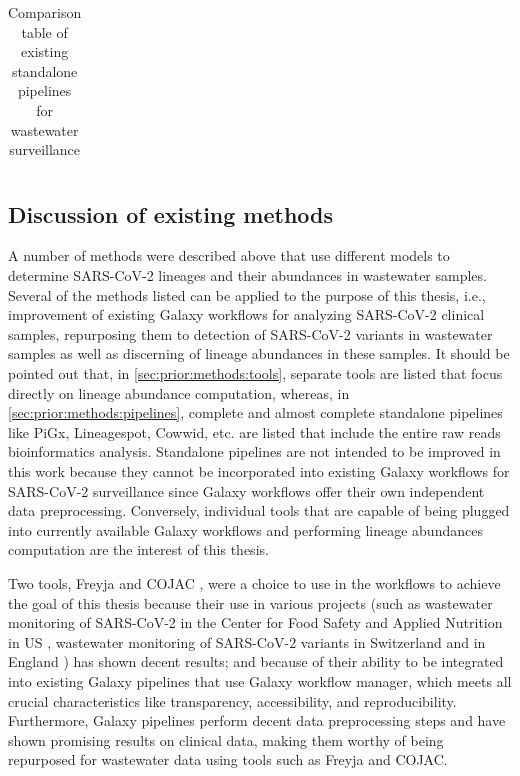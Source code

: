 \begin{landscape}
\begin{table}[ht!]
\begin{tabular}{l|l|l|l|l|l|l|l|l|l|l}
                \end{tabular}
                \caption{Comparison table of existing standalone pipelines for wastewater surveillance} \label{tab:prior:methods-pipelines}
                \end{table}
                \vfill
            \end{landscape}
        

    \subsection{Discussion of existing methods} \label{sec:prior:discussion}
    A number of methods were described above that use different models to determine SARS-CoV-2 lineages and their abundances in wastewater samples. Several of the methods listed can be applied to the purpose of this thesis, i.e., improvement of existing Galaxy workflows for analyzing SARS-CoV-2 clinical samples, repurposing them to detection of SARS-CoV-2 variants in wastewater samples as well as discerning of lineage abundances in these samples. It should be pointed out that, in \cref{sec:prior:methods:tools}, separate tools are listed that focus directly on lineage abundance computation, whereas, in \cref{sec:prior:methods:pipelines}, complete and almost complete standalone pipelines like PiGx, Lineagespot, Cowwid, etc. are listed that include the entire raw reads bioinformatics analysis. Standalone pipelines are not intended to be improved in this work because they cannot be incorporated into existing Galaxy workflows for SARS-CoV-2 surveillance since Galaxy workflows offer their own independent data preprocessing. Conversely, individual tools that are capable of being plugged into currently available Galaxy workflows and performing lineage abundances computation are the interest of this thesis.

    Two tools, Freyja \cite{joshuailevy2022,karthikeyan2022} and COJAC \cite{jahn2021}, were a choice to use in the workflows to achieve the goal of this thesis because their use in various projects (such as wastewater monitoring of SARS-CoV-2 in the Center for Food Safety and Applied Nutrition in US \cite{nutrition2022}, wastewater monitoring of SARS-CoV-2 variants in Switzerland \cite{jahn2022} and in England \cite{jbc}) has shown decent results; and because of their ability to be integrated into existing Galaxy pipelines that use Galaxy workflow manager, which meets all crucial characteristics like transparency, accessibility, and reproducibility. Furthermore, Galaxy pipelines perform decent data preprocessing steps and have shown promising results on clinical data, making them worthy of being repurposed for wastewater data using tools such as Freyja and COJAC. 
    
